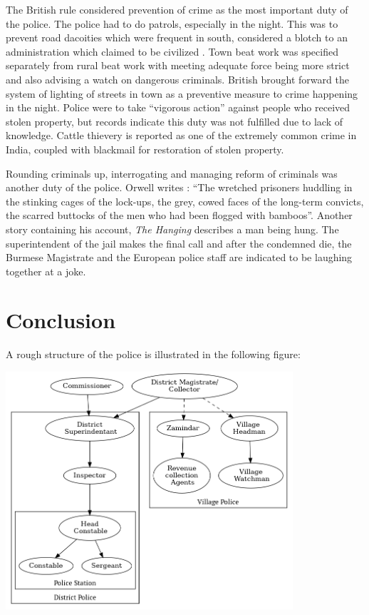 \documentclass[a4paper]{article}
\begin{document}
The British rule considered prevention of crime as the most important
duty of the police. The police had to do patrols, especially in
the night. This was to prevent road dacoities which were
frequent in south, considered a blotch to an administration
which claimed to be civilized \cite[p. 48]{india1913history}.
Town beat work was specified separately from rural beat work
with meeting adequate force being more strict and also advising
a watch on dangerous criminals. British brought forward the
system of lighting of streets in town as a preventive measure to
crime happening in the night. Police were to take ``vigorous
action'' \cite[p. 49]{india1913history} against people who
received stolen property, but records indicate this duty was not
fulfilled due to lack of knowledge. Cattle thievery is reported
\cite[p.52]{india1913history} as one of the extremely common
crime in India, coupled with blackmail for restoration of stolen
property.

Rounding criminals up, interrogating and managing reform of
criminals was another duty of the police.
Orwell\cite{orwellshooting} writes : ``The wretched prisoners
huddling in the stinking cages of the lock-ups, the grey, cowed
faces of the long-term convicts, the scarred buttocks of the men
who had been flogged with bamboos''. Another story containing
his account, \emph{The Hanging}\cite{orwellhanging} describes a
man being hung. The superintendent of the jail makes the final
call and after the condemned die, the Burmese Magistrate and the
European police staff are indicated to be laughing together at a
joke.

\section*{Conclusion}

A rough structure of the police is illustrated in the following
figure:

\begin{centering}
    \begin{center}
     \includegraphics[width=0.8\textwidth]{police_structure}
     \end{center}
 \end{centering}
\end{document}
